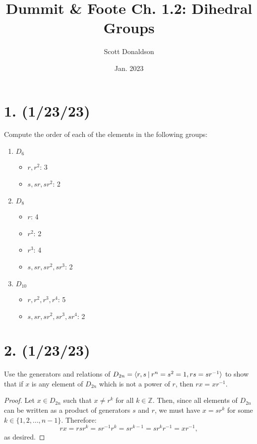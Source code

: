 \documentclass{article}
\title{Dummit \& Foote Ch. 1.2: Dihedral Groups}
\author{Scott Donaldson}
\date{Jan. 2023}
\begin{document}
\maketitle

\section*{1. (1/23/23)}

Compute the order of each of the elements in the following groups:

\begin{enumerate}[label=(\alph*)]
    \item $D_6$
        \begin{itemize}
            \item $r, r^2$: 3
            \item $s, sr, sr^2$: 2
        \end{itemize}
    
    \item $D_8$
        \begin{itemize}
            \item $r$: 4
            \item $r^2$: 2
            \item $r^3$: 4
            \item $s, sr, sr^2, sr^3$: 2
        \end{itemize}

    \item $D_{10}$
        \begin{itemize}
            \item $r, r^2, r^3, r^4$: 5
            \item $s, sr, sr^2, sr^3, sr^4$: 2
        \end{itemize}
    
\end{enumerate}

\section*{2. (1/23/23)}

Use the generators and relations of $D_{2n} = \langle r, s\hspace{0.5ex}|\hspace{0.5ex} r^n = s^2 = 1, rs = sr^{-1} \rangle$ to show that if $x$ is any element of $D_{2n}$ which is not a power of $r$, then $rx = xr^{-1}$. 

\begin{proof}
    Let $x \in D_{2n}$ such that $x \neq r^k$ for all $k \in \mathbb{Z}$. Then, since all elements of $D_{2n}$ can be written as a product of generators $s$ and $r$, we must have $x = sr^k$ for some $k \in \{ 1, 2, ..., n - 1 \}$. Therefore:
    \begin{equation*}
        rx = rsr^k = sr^{-1} r^k = sr^{k - 1} = sr^k r^{-1} = x r^{-1},
    \end{equation*}
    as desired.
\end{proof}
\end{document}
